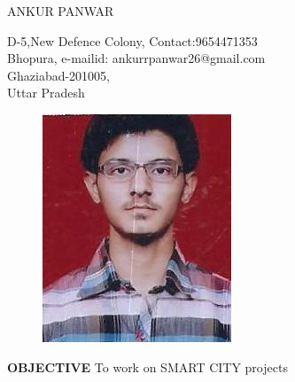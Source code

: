 \documentclass{article}
\begin{document}
\begin{center}
	{
		\large{ANKUR PANWAR}
	}
\end{center}
\begin{flushleft}
D-5,New Defence Colony, \hspace{3.6in} Contact:9654471353\\
Bhopura, \hspace{3.5in} e-mailid: ankurrpanwar26@gmail.com\\
Ghaziabad-201005,\\
Uttar Pradesh\\
\end{flushleft}
\vspace{-0.3in}
\begin{figure}[h]
\hspace{4.4in}
	\includegraphics{img.jpg}
\end{figure}

\begin{flushleft}
	\textbf{OBJECTIVE}
	\vspace{-0.20in}
	\hspace{.5in}
	To work on SMART CITY projects
\end{flushleft}
\end{document}

